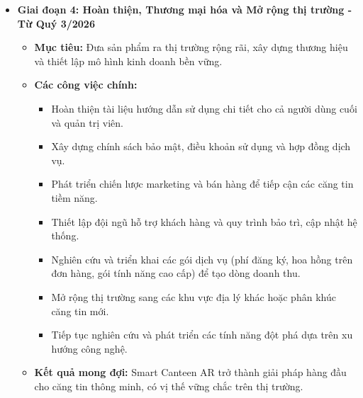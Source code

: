 \documentclass[12pt,a4paper]{article}
\begin{document}
\begin{itemize}[label=\textbullet]
    \item \textbf{Giai đoạn 4: Hoàn thiện, Thương mại hóa và Mở rộng thị trường - Từ Quý 3/2026}
    \begin{itemize}[label=\textbullet]
        \item \textbf{Mục tiêu:} Đưa sản phẩm ra thị trường rộng rãi, xây dựng thương hiệu và thiết lập mô hình kinh doanh bền vững.
        \item \textbf{Các công việc chính:}
        \begin{itemize}[label=\textrightarrow]
            \item Hoàn thiện tài liệu hướng dẫn sử dụng chi tiết cho cả người dùng cuối và quản trị viên.
            \item Xây dựng chính sách bảo mật, điều khoản sử dụng và hợp đồng dịch vụ.
            \item Phát triển chiến lược marketing và bán hàng để tiếp cận các căng tin tiềm năng.
            \item Thiết lập đội ngũ hỗ trợ khách hàng và quy trình bảo trì, cập nhật hệ thống.
            \item Nghiên cứu và triển khai các gói dịch vụ (phí đăng ký, hoa hồng trên đơn hàng, gói tính năng cao cấp) để tạo dòng doanh thu.
            \item Mở rộng thị trường sang các khu vực địa lý khác hoặc phân khúc căng tin mới.
            \item Tiếp tục nghiên cứu và phát triển các tính năng đột phá dựa trên xu hướng công nghệ.
        \end{itemize}
        \item \textbf{Kết quả mong đợi:} Smart Canteen AR trở thành giải pháp hàng đầu cho căng tin thông minh, có vị thế vững chắc trên thị trường.
    \end{itemize}


\end{itemize}
\end{document}
